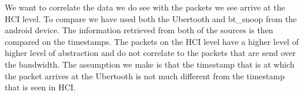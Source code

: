 We want to correlate the data we do see with the packets we see arrive at the HCI level. To compare we have used both the Ubertooth and bt\_snoop from the android device. The information retrieved from both of the sources is then compared on the timestamps. The packets on the HCI level have a higher level of higher level of abstraction and do not correlate to the packets that are send over the bandwidth. The assumption we make is that the timestamp that is at which the packet arrives at the Ubertooth is not much different from the timestamp that is seen in HCI.
